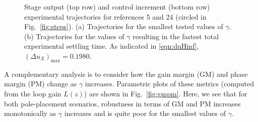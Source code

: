 \documentclass[twocolumn,twoside]{IEEEtran}
\begin{document}
\begin{figure}[ht!]
  \begin{subfigure}{1\columnwidth}
    
    \caption{
    }
  \label{fig:min_gam_traj}
\end{subfigure}
\hfill
\begin{subfigure}{1\columnwidth}
  
  \caption{
  }
  \label{fig:rob_gam_traj}
\end{subfigure}
\caption{Stage output (top row) and control increment (bottom row) experimental trajectories for references 5 and 24 (circled in Fig.~\ref{fig:steps}). (a) Trajectories for the smallest tested values of $\gamma$. (b) Trajectories for the values of $\gamma$ resulting in the fastest total experimental settling time. As indicated in \eqref{eqn:duHinf}, $(\Delta u_{X})_{\textrm{max}} = 0.1980$.}
\end{figure}

A complementary analysis is to consider how the gain margin (GM) and phase margin (PM) change as $\gamma$ increases. Parametric plots of these metrics (computed from the loop gain $L(z)$) are shown in Fig.~\ref{fig:gmpm}. 
Here, we see that for both pole-placement scenarios, robustness in terms of GM and PM increases monotonically as $\gamma$ increases and is quite poor for the smallest values of $\gamma$.
\end{document}
